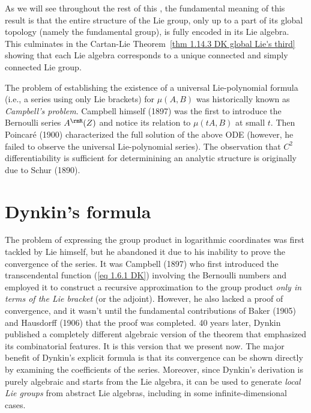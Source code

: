 \begin{rem}
    As we will see throughout the rest of this \chap, the fundamental meaning of this result is that the entire structure of the Lie group, only up to a part of its global topology (namely the fundamental group), is fully encoded in its Lie algebra. This culminates in the Cartan-Lie Theorem~\ref{thm 1.14.3 DK global Lie's third} showing that each Lie algebra corresponds to a unique connected and simply connected Lie group.
\end{rem}


\begin{hrem*}
    The problem of establishing the existence of a universal Lie-polynomial formula (i.e.,  a series using only Lie brackets) for $\mu(A,B)$ was historically known as \emph{Campbell's problem}. Campbell himself (1897) was the first to introduce the Bernoulli series $A^\rmR(Z)$ and notice its relation to $\mu(tA,B)$ at small $t$. Then Poincar\'e (1900) characterized the full solution of the above ODE (however, he failed to observe the universal Lie-polynomial series). The observation that $C^2$ differentiability is sufficient for determinining an analytic structure is originally due to Schur (1890).
\end{hrem*}





\section{Dynkin's formula}

\begin{hrem*}
    The problem of expressing the group product in logarithmic coordinates was first tackled by Lie himself, but he abandoned it due to his inability to prove the convergence of the series. It was Campbell (1897) who first introduced the transcendental function (\ref{eq 1.6.1 DK}) involving the Bernoulli numbers and employed it to construct a recursive approximation to the group product \emph{only in terms of the Lie bracket} (or the adjoint). However, he also lacked a proof of convergence, and it wasn't until the fundamental contributions of Baker (1905) and Hausdorff (1906) that the proof was completed. 40 years later, Dynkin published a completely different algebraic version of the theorem that emphasized its combinatorial features. It is this version that we present now. The major benefit of Dynkin's explicit formula is that its convergence can be shown directly by examining the coefficients of the series. Moreover, since Dynkin's derivation is purely algebraic and starts from the Lie algebra, it can be used to generate \emph{local Lie groups} from abstract Lie algebras, including in some infinite-dimensional cases.
\end{hrem*}

